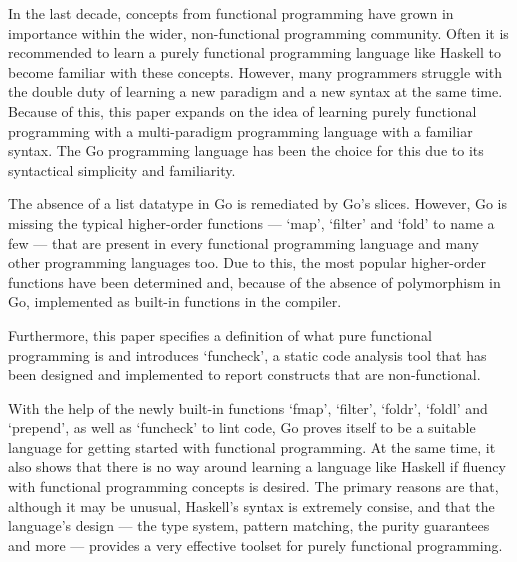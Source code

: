 
In the last decade, concepts from functional programming have grown in
importance within the wider, non-functional programming community.
Often it is recommended to learn a purely functional programming language
like Haskell to become familiar with these concepts.
However, many programmers struggle with the double duty
of learning a new paradigm and a new syntax at the same time. Because of
this, this paper expands on the idea of learning purely functional programming
with a multi-paradigm programming language with a familiar syntax. The Go
programming language has been the choice for this due to its syntactical
simplicity and familiarity.

The absence of a list datatype in Go is remediated by Go's slices.
However, Go is missing the typical higher-order functions ---
`map', `filter' and `fold' to name a few --- that are present in every
functional programming language and many other programming languages too. Due to
this, the most popular higher-order functions have been determined and, because of the
absence of polymorphism in Go, implemented as built-in functions in the compiler.

Furthermore, this paper specifies a definition of what pure functional programming is and
introduces `funcheck', a static code analysis tool that has been designed and implemented to
report constructs that are non-functional.

With the help of the newly built-in functions `fmap', `filter', `foldr', `foldl' and
`prepend', as well as `funcheck' to lint code, Go proves itself to be a
suitable language for getting started with functional programming.
At the same time, it also shows that there is no way around learning a
language like Haskell if fluency with functional programming concepts
is desired. The primary reasons are that, although it may be unusual, Haskell's
syntax is extremely consise, and that the language's design --- the type system,
pattern matching, the purity guarantees and more --- provides a very effective toolset
for purely functional programming.
